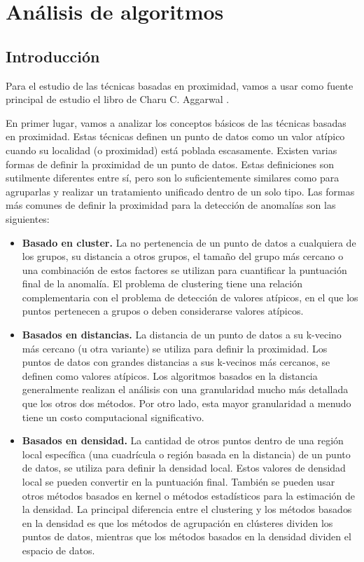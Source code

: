 \chapter{Análisis de algoritmos}\label{cap:Analisis}

\section{Introducción}
Para el estudio de las técnicas basadas en proximidad, vamos a usar como
fuente principal de estudio el libro de Charu C. Aggarwal
\cite{aggarwalOutlierAnalysis2017}.

En primer lugar, vamos a analizar los conceptos básicos de las técnicas basadas
en proximidad. Estas técnicas definen un punto de datos como un valor 
atípico cuando su localidad (o proximidad) está poblada escasamente.
Existen varias formas de definir la proximidad de un punto de datos.
Estas definiciones son sutilmente diferentes entre sí, pero son lo suficientemente
similares como para agruparlas y realizar un tratamiento unificado 
dentro de un solo tipo. Las formas más comunes de definir la proximidad 
para la detección de anomalías son las siguientes:


\begin{itemize}
    \item \textbf{Basado en cluster.} La no pertenencia de un punto de 
    datos a cualquiera de los grupos, su distancia a otros grupos,
    el tamaño del grupo más cercano o una combinación de estos factores
    se utilizan para cuantificar la puntuación final de la anomalía.
    El problema de clustering tiene una relación complementaria
    con el problema de detección de valores atípicos, en el que los 
    puntos pertenecen a grupos o deben considerarse valores atípicos.
    \item \textbf{Basados en distancias.} La distancia de un punto de 
    datos a su k-vecino más cercano (u otra variante) se utiliza para 
    definir la proximidad. Los puntos de datos con grandes distancias 
    a sus k-vecinos más cercanos, se definen como valores atípicos. 
    Los algoritmos basados en la distancia generalmente realizan el 
    análisis con una granularidad mucho más detallada que los otros dos 
    métodos. Por otro lado, esta mayor granularidad a menudo tiene un 
    costo computacional significativo.
    \item \textbf{Basados en densidad.} La cantidad de otros puntos 
    dentro de una región local específica (una cuadrícula o 
    región basada en la distancia) de un punto de datos, 
    se utiliza para definir la densidad local. Estos valores de 
    densidad local se pueden convertir en la puntuación final. 
    También se pueden usar otros métodos basados en kernel o métodos 
    estadísticos para la estimación de la densidad. La principal diferencia 
    entre el clustering y los métodos basados en la densidad es que los 
    métodos de agrupación en clústeres dividen los puntos de datos, 
    mientras que los métodos basados en la densidad dividen el espacio 
    de datos.

\end{itemize}

